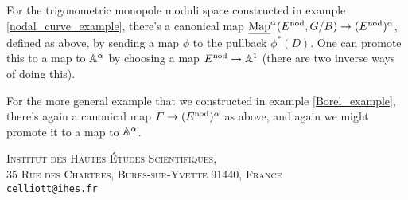 \documentclass[10pt, oneside, a4paper]{article}
\newcommand{\map}{\ul{\mr{Map}}}
\begin{document}
\begin{example}
For the trigonometric monopole moduli space constructed in example \ref{nodal_curve_example}, there's a canonical map $\map^\alpha(E^{\mr{nod}}, G/B) \to (E^{\mr{nod}})^\alpha$, defined as above, by sending a map $\phi$ to the pullback $\phi^*(D)$.  One can promote this to a map to $\mathbb{A}^\alpha$ by choosing a map $E^{\mathrm{nod}}\to \mathbb{A}^1$ (there are two inverse ways of doing this).
\end{example}

\begin{example}
For the more general example that we constructed in example \ref{Borel_example}, there's again a canonical map $F \to (E^{\mathrm{nod}})^\alpha$ as above, and again we might promote it to a map to $\mathbb{A}^\alpha$.
\end{example}





\textsc{Institut des Hautes \'Etudes Scientifiques,}\\
\textsc{35 Rue des Chartres, Bures-sur-Yvette 91440, France} \\
\texttt{celliott@ihes.fr}\\
\end{document}
